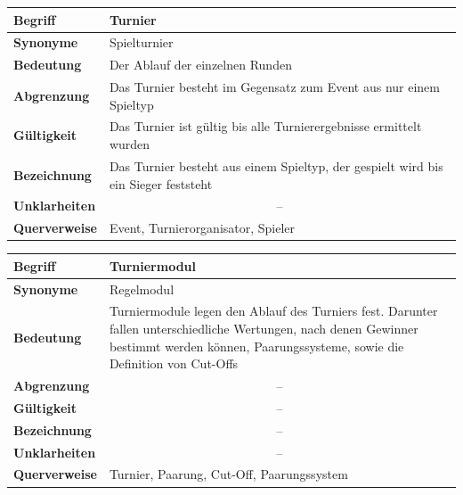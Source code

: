 \documentclass[11pt]{article}
\begin{document}
\begin{tabularx}{\textwidth}{| p{} | p{} |}
	\hline
	\textbf{Begriff} & Turnier\\
	\hline
	\textbf{Synonyme} & Spielturnier \\
	\hline
	\textbf{Bedeutung} & Der Ablauf der einzelnen Runden\\
	\hline
	\textbf{Abgrenzung} & Das Turnier besteht im Gegensatz zum Event aus nur einem Spieltyp\\
	\hline
	\textbf{Gültigkeit} & Das Turnier ist gültig bis alle Turnierergebnisse ermittelt wurden\\
	\hline
	\textbf{Bezeichnung} & Das Turnier besteht aus einem Spieltyp, der gespielt wird bis ein Sieger feststeht\\
	\hline
	\textbf{Unklarheiten} & \multicolumn{1}{c|}{--} \\
	\hline
	\textbf{Querverweise} & Event, Turnierorganisator, Spieler \\
	\hline
\end{tabularx}

\begin{tabularx}{\textwidth}{| p{} | p{} |}
	\hline
	\textbf{Begriff} & Turniermodul\\
	\hline
	\textbf{Synonyme} & Regelmodul\\
	\hline
	\textbf{Bedeutung} & Turniermodule legen den Ablauf des Turniers fest. Darunter fallen unterschiedliche Wertungen, nach denen Gewinner bestimmt werden können, Paarungssysteme, sowie die Definition von Cut-Offs\\
	\hline
	\textbf{Abgrenzung} & \multicolumn{1}{c|}{--} \\
	\hline
	\textbf{Gültigkeit} & \multicolumn{1}{c|}{--} \\
	\hline
	\textbf{Bezeichnung} & \multicolumn{1}{c|}{--} \\
	\hline
	\textbf{Unklarheiten} & \multicolumn{1}{c|}{--} \\
	\hline
	\textbf{Querverweise} & Turnier, Paarung, Cut-Off, Paarungssystem\\
	\hline
\end{tabularx}
\end{document}
